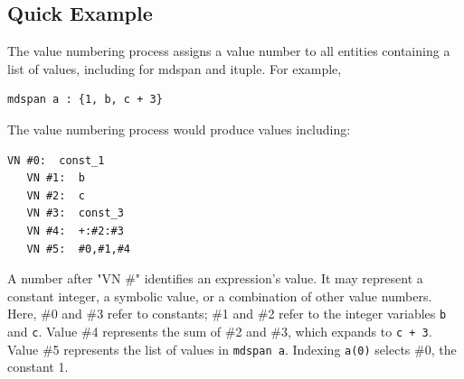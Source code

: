 \subsection*{Quick Example}

The value numbering process assigns a value number to all entities containing a list of values, including for mdspan and ituple. For example,

\begin{lstlisting}[language=croqtile,caption={A shape expression}]
mdspan a : {1, b, c + 3}
\end{lstlisting}

The value numbering process would produce values including:

\begin{lstlisting}[language=croqtile,caption={Its value-number graph}]
   VN #0:  const_1
   VN #1:  b
   VN #2:  c
   VN #3:  const_3
   VN #4:  +:#2:#3
   VN #5:  #0,#1,#4
\end{lstlisting}

A number after "VN \#" identifies an expression's value. It may represent a constant integer, a symbolic value, or a combination of other value numbers. Here, \#0 and \#3 refer to constants; \#1 and \#2 refer to the integer variables \texttt{b} and \texttt{c}. Value \#4 represents the sum of \#2 and \#3, which expands to \texttt{c + 3}. Value \#5 represents the list of values in \texttt{mdspan a}. Indexing \texttt{a(0)} selects \#0, the constant 1.
